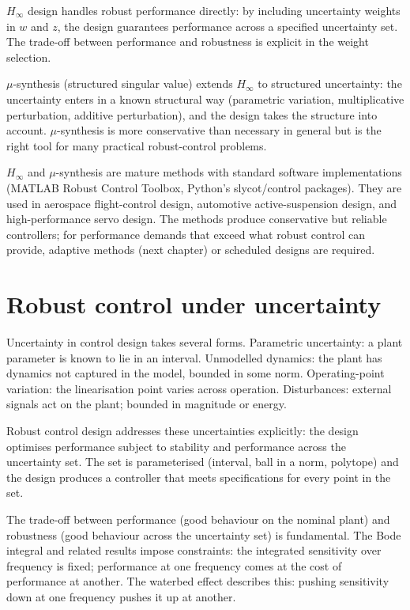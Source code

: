 $H_\infty$ design handles robust performance directly: by including uncertainty weights in $w$ and $z$, the design guarantees performance across a specified uncertainty set. The trade-off between performance and robustness is explicit in the weight selection.

$\mu$-synthesis (structured singular value) extends $H_\infty$ to structured uncertainty: the uncertainty enters in a known structural way (parametric variation, multiplicative perturbation, additive perturbation), and the design takes the structure into account. $\mu$-synthesis is more conservative than necessary in general but is the right tool for many practical robust-control problems.

$H_\infty$ and $\mu$-synthesis are mature methods with standard software implementations (MATLAB Robust Control Toolbox, Python's slycot/control packages). They are used in aerospace flight-control design, automotive active-suspension design, and high-performance servo design. The methods produce conservative but reliable controllers; for performance demands that exceed what robust control can provide, adaptive methods (next chapter) or scheduled designs are required.

\section{Robust control under uncertainty}

Uncertainty in control design takes several forms. Parametric uncertainty: a plant parameter is known to lie in an interval. Unmodelled dynamics: the plant has dynamics not captured in the model, bounded in some norm. Operating-point variation: the linearisation point varies across operation. Disturbances: external signals act on the plant; bounded in magnitude or energy.

Robust control design addresses these uncertainties explicitly: the design optimises performance subject to stability and performance across the uncertainty set. The set is parameterised (interval, ball in a norm, polytope) and the design produces a controller that meets specifications for every point in the set.

The trade-off between performance (good behaviour on the nominal plant) and robustness (good behaviour across the uncertainty set) is fundamental. The Bode integral and related results impose constraints: the integrated sensitivity over frequency is fixed; performance at one frequency comes at the cost of performance at another. The waterbed effect describes this: pushing sensitivity down at one frequency pushes it up at another.


